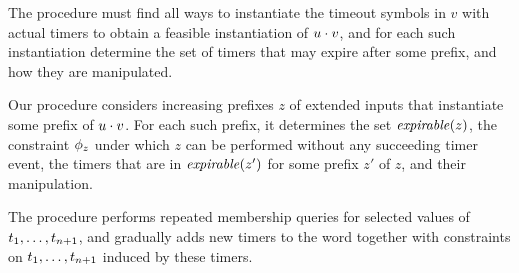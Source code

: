 


The procedure must find all ways to instantiate the timeout symbols in $v$
with actual timers to obtain a feasible instantiation of $u\cdot v$, and for
each such instantiation determine the set of timers that may expire after some
prefix, and how they are manipulated.

Our procedure considers increasing prefixes $z$ of extended inputs that
instantiate some prefix of $u \cdot v$. For each such prefix, it
determines the set $\mathit{expirable}(z)$, the constraint $\phi_{z}$
under which $z$ can be performed without any succeeding timer event, 
the timers that are in $\mathit{expirable}(z')$ for some prefix $z'$ of $z$, and
their manipulation.

The procedure performs repeated membership queries for selected values
of ${t}_1 , \ldots , {t}_{n+1}$, and gradually adds new timers to the word together
with constraints on ${t}_1 , \ldots , {t}_{n+1}$ induced by these timers.


